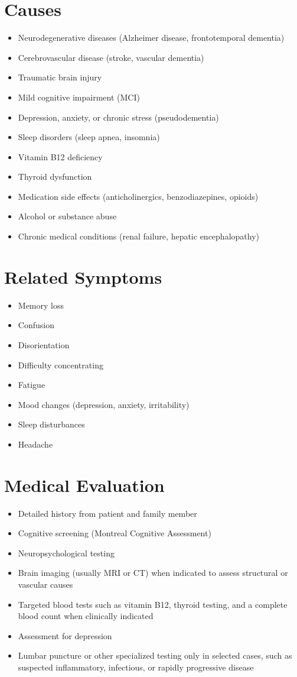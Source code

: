 \section*{Causes}
\begin{itemize}
\item Neurodegenerative diseases (Alzheimer disease, frontotemporal dementia)
\item Cerebrovascular disease (stroke, vascular dementia)
\item Traumatic brain injury
\item Mild cognitive impairment (MCI)
\item Depression, anxiety, or chronic stress (pseudodementia)
\item Sleep disorders (sleep apnea, insomnia)
\item Vitamin B12 deficiency
\item Thyroid dysfunction
\item Medication side effects (anticholinergics, benzodiazepines, opioids)
\item Alcohol or substance abuse
\item Chronic medical conditions (renal failure, hepatic encephalopathy)
\end{itemize}

\section*{Related Symptoms}
\begin{itemize}
\item Memory loss
\item Confusion
\item Disorientation
\item Difficulty concentrating
\item Fatigue
\item Mood changes (depression, anxiety, irritability)
\item Sleep disturbances
\item Headache
\end{itemize}

\section*{Medical Evaluation}
\begin{itemize}
\item Detailed history from patient and family member
\item Cognitive screening (Montreal Cognitive Assessment)
\item Neuropsychological testing
 \item Brain imaging (usually MRI or CT) when indicated to assess structural or vascular causes
 \item Targeted blood tests such as vitamin B12, thyroid testing, and a complete blood count when clinically indicated
\item Assessment for depression
 \item Lumbar puncture or other specialized testing only in selected cases, such as suspected inflammatory, infectious, or rapidly progressive disease
\end{itemize}

